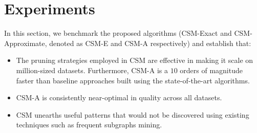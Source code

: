 \chapter{Experiments}
\label{sec:experiments}

In this section, we benchmark the proposed algorithms (CSM-Exact and CSM-Approximate, denoted as CSM-E and CSM-A respectively) and establish that:
\begin{itemize}
\item The pruning strategies employed in CSM are effective in making it scale on million-sized datasets. Furthermore, CSM-A is a $10$ orders of magnitude faster than baseline approaches built using the state-of-the-art algorithms.
\item CSM-A is consistently near-optimal in quality across all datasets.
\item CSM unearths useful patterns that would not be discovered using existing techniques such as frequent subgraphs mining.
\end{itemize}





